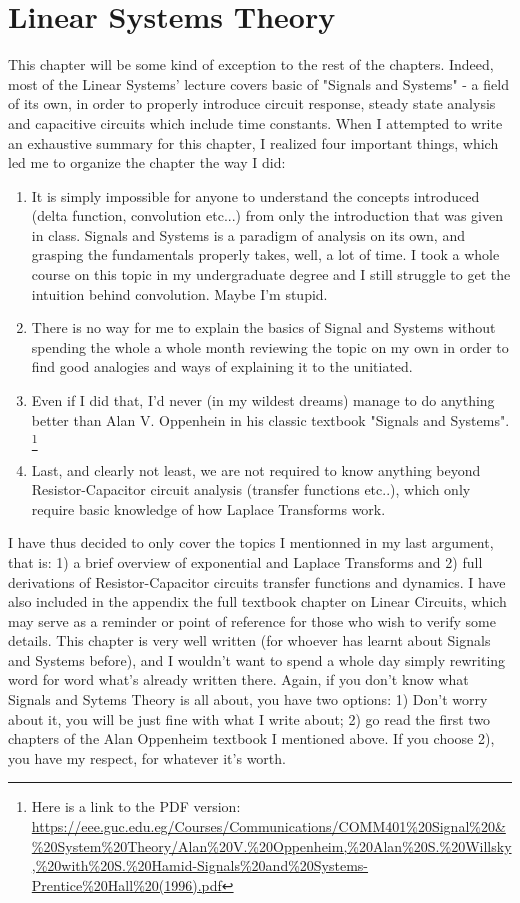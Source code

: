 \newpage
\section{Linear Systems Theory}

This chapter will be some kind of exception to the rest of the chapters. Indeed, most of the Linear Systems' lecture covers basic of "Signals and Systems" - a field of its own, in order to properly introduce circuit response, steady state analysis and capacitive circuits which include time constants. When I attempted to write an exhaustive summary for this chapter, I realized four important things, which led me to organize the chapter the way I did: 

\begin{enumerate}
    \item It is simply impossible for anyone to understand the concepts introduced (delta function, convolution etc...) from only the introduction that was given in class. Signals and Systems is a paradigm of analysis on its own, and grasping the fundamentals properly takes, well, a lot of time. I took a whole course on this topic in my undergraduate degree and I still struggle to get the intuition behind convolution. Maybe I'm stupid. 
    \item There is no way for me to explain the basics of Signal and Systems without spending the whole a whole month reviewing the topic on my own in order to find good analogies and ways of explaining it to the unitiated. 
    \item Even if I did that, I'd never (in my wildest dreams) manage to do anything better than Alan V. Oppenhein in his classic textbook "Signals and Systems". \footnote{Here is a link to the PDF version: \url{https://eee.guc.edu.eg/Courses/Communications/COMM401\%20Signal\%20&\%20System\%20Theory/Alan\%20V.\%20Oppenheim,\%20Alan\%20S.\%20Willsky,\%20with\%20S.\%20Hamid-Signals\%20and\%20Systems-Prentice\%20Hall\%20(1996).pdf}}
    \item Last, and clearly not least, we are not required to know anything beyond Resistor-Capacitor circuit analysis (transfer functions etc..), which only require basic knowledge of how Laplace Transforms work.
\end{enumerate}

I have thus decided to only cover the topics I mentionned in my last argument, that is: 1) a brief overview of exponential and Laplace Transforms and 2) full derivations of Resistor-Capacitor circuits transfer functions and dynamics. I have also included in the appendix the full textbook chapter on Linear Circuits, which may serve as a reminder or point of reference for those who wish to verify some details. This chapter is very well written (for whoever has learnt about Signals and Systems before), and I wouldn't want to spend a whole day simply rewriting word for word what's already written there. Again, if you don't know what Signals and Sytems Theory is all about, you have two options: 1) Don't worry about it, you will be just fine with what I write about; 2) go read the first two chapters of the Alan Oppenheim textbook I mentioned above. If you choose 2), you have my respect, for whatever it's worth.   

